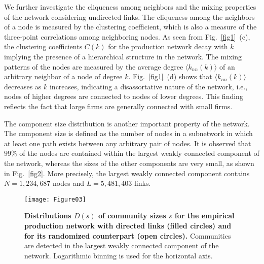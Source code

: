 \documentclass[pre,floatfix,twocolumn,showpacs,a4paper,nofootinbib]{revtex4}
\begin{document}
We further investigate the cliqueness among neighbors and the mixing properties of the network considering undirected links. 
The cliqueness among the neighbors of a node is measured by the clustering coefficient, which is also a measure of the three-point
correlations among neighboring nodes. As seen from Fig.~\ref{fig1}~(c), the clustering coefficients $C(k)$ for 
the production network decay with $k$ 
implying the presence of a hierarchical structure in the network. The mixing patterns of the nodes are measured by the average degree $\langle k_{nn}(k) \rangle$
of an arbitrary neighbor of a node of degree $k$. Fig.~\ref{fig1}~(d) shows that $\langle k_{nn}(k) \rangle$ decreases 
as $k$ increases,
indicating a disassortative nature of the
network, i.e., nodes of higher degrees are connected to nodes of lower degrees. This finding reflects the fact that large firms are generally
connected with small firms. 

The component size distribution is another important property of the network. The component size is defined as the number of nodes 
in a subnetwork in which at least one path exists between any arbitrary pair of nodes.
It is observed that $99\%$ of the nodes are contained within the largest weakly connected component of the network, whereas the sizes of the other components are very small, as shown in Fig.~\ref{fig2}. 
More precisely, the largest weakly connected component contains  $ N = 1, 234, 687$ nodes and  $ L = 5, 481, 403$ links. 





\begin{figure}[t]
\begin{center}
\texttt{[image: Figure03]}
\end{center}
\caption{
{\bf Distributions $D(s)$ of community sizes $s$ for the empirical production network with directed links (filled circles) and for its randomized counterpart (open circles).
} 
Communities are detected in the largest weakly connected component of the network.
Logarithmic binning is used for the horizontal axis. 
}
\label{fig3}
\end{figure}
\end{document}
